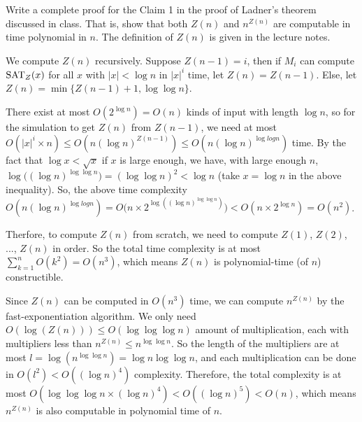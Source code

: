 \documentclass{homework}
\begin{document}
\begin{problem}
  Write a complete proof for the Claim 1 in the proof of Ladner's theorem
  discussed in class.
  That is, show that both $Z(n)$ and $n^{Z(n)}$ are computable in time
  polynomial in $n$.
  The definition of $Z(n)$ is given in the lecture notes.
\end{problem}

\begin{solution}
  We compute $Z(n)$ recursively. Suppose $Z(n-1)=i$, then if $M_i$ can compute $\mathrm{SAT}_Z(x)$ for all $x$ with $|x|<\log n$ in $|x|^i$ time, let $Z(n)=Z(n-1)$. Else, let $Z(n)=\min\{Z(n-1)+1,\log\log n\}$.
  
  There exist at most $O(2^{\log n}) = O(n)$ kinds of input with length $\log n$, so for the simulation to get $Z(n)$ from $Z(n-1)$, we need at most $O(|x|^i\times n)\le O(n(\log n)^{Z(n-1)})\le O(n(\log n)^{\log log n})$ time. By the fact that $\log x<\sqrt{x}$ if $x$ is large enough, we have, with large enough $n$, $\log\bigl((\log n)^{\log\log n}\bigr)= (\log\log n)^2<\log n$ (take $x=\log n$ in the above inequality). So, the above time complexity $O(n(\log n)^{\log log n}) = O\bigl(n\times 2^{\log((\log n)^{\log\log n})}\bigr) < O(n\times 2^{\log n}) = O(n^2)$. 
  
  Therfore, to compute $Z(n)$ from scratch, we need to compute $Z(1)$, $Z(2)$, ..., $Z(n)$ in order. So the total time complexity is at most $\sum_{k=1}^n O(k^2) = O(n^3)$, which means $Z(n)$ is polynomial-time (of $n$) constructible.

  Since $Z(n)$ can be computed in $O(n^3)$ time, we can compute $n^{Z(n)}$ by the fast-exponentiation algorithm. We only need $O(\log(Z(n)))\le O(\log\log\log n)$ amount of multiplication, each with multipliers less than $n^{Z(n)}\le n^{\log\log n}$. So the length of the multipliers are at most $l=\log(n^{\log\log n}) = \log n\log\log n$, and each multiplication can be done in $O(l^2) < O((\log n)^4)$ complexity. Therefore, the total complexity is at most $O(\log\log\log n \times (\log n)^4)< O((\log n)^5)< O(n)$, which means $n^{Z(n)}$ is also computable in polynomial time of $n$.
\end{solution}
\end{document}
